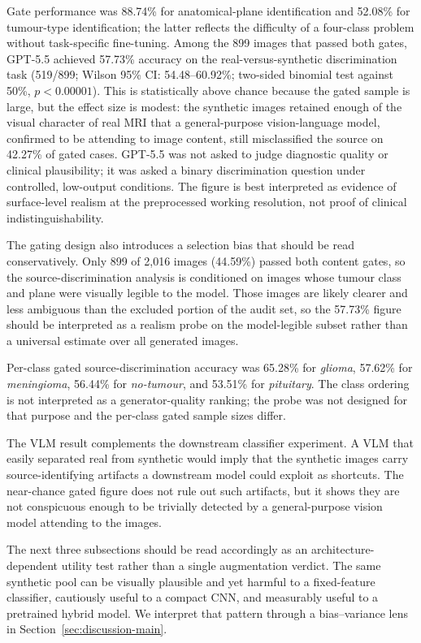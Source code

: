 \documentclass[conference,twoside]{IEEEtran}
\begin{document}
Gate performance was 88.74\% for anatomical-plane identification and 52.08\% for tumour-type identification; the latter reflects the difficulty of a four-class problem without task-specific fine-tuning. Among the 899 images that passed both gates, GPT-5.5 achieved 57.73\% accuracy on the real-versus-synthetic discrimination task (519/899; Wilson 95\% CI: 54.48--60.92\%; two-sided binomial test against 50\%, $p<0.00001$). This is statistically above chance because the gated sample is large, but the effect size is modest: the synthetic images retained enough of the visual character of real MRI that a general-purpose vision-language model, confirmed to be attending to image content, still misclassified the source on 42.27\% of gated cases. GPT-5.5 was not asked to judge diagnostic quality or clinical plausibility; it was asked a binary discrimination question under controlled, low-output conditions. The figure is best interpreted as evidence of surface-level realism at the preprocessed working resolution, not proof of clinical indistinguishability.

The gating design also introduces a selection bias that should be read conservatively. Only 899 of 2,016 images (44.59\%) passed both content gates, so the source-discrimination analysis is conditioned on images whose tumour class and plane were visually legible to the model. Those images are likely clearer and less ambiguous than the excluded portion of the audit set, so the 57.73\% figure should be interpreted as a realism probe on the model-legible subset rather than a universal estimate over all generated images.

Per-class gated source-discrimination accuracy was 65.28\% for \textit{glioma}, 57.62\% for \textit{meningioma}, 56.44\% for \textit{no-tumour}, and 53.51\% for \textit{pituitary}. The class ordering is not interpreted as a generator-quality ranking; the probe was not designed for that purpose and the per-class gated sample sizes differ.

The VLM result complements the downstream classifier experiment. A VLM that easily separated real from synthetic would imply that the synthetic images carry source-identifying artifacts a downstream model could exploit as shortcuts. The near-chance gated figure does not rule out such artifacts, but it shows they are not conspicuous enough to be trivially detected by a general-purpose vision model attending to the images.

The next three subsections should be read accordingly as an architecture-dependent utility test rather than a single augmentation verdict. The same synthetic pool can be visually plausible and yet harmful to a fixed-feature classifier, cautiously useful to a compact CNN, and measurably useful to a pretrained hybrid model. We interpret that pattern through a bias--variance lens in Section~\ref{sec:discussion-main}.
\end{document}
